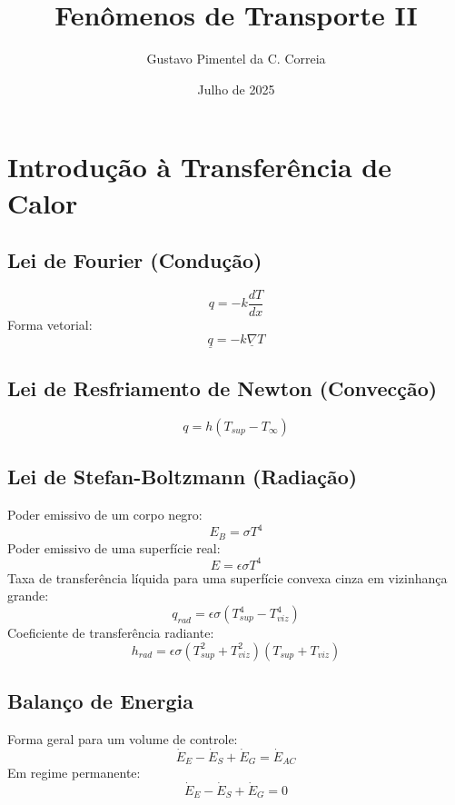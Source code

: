 \documentclass[12pt, a4paper]{article}
\title{\textbf{Fenômenos de Transporte II}}
\author{Gustavo Pimentel da C. Correia}
\date{Julho de 2025}
\begin{document}
\maketitle
\thispagestyle{empty}

\tableofcontents
\newpage

\section{Introdução à Transferência de Calor}

\subsection{Lei de Fourier (Condução)}
\begin{equation}
    q = -k \frac{dT}{dx} 
\end{equation}
Forma vetorial:
\begin{equation}
    \underline{q} = -k \underline{\nabla}T
\end{equation}

\subsection{Lei de Resfriamento de Newton (Convecção)}
\begin{equation}
    q = h (T_{sup} - T_{\infty})
\end{equation}

\subsection{Lei de Stefan-Boltzmann (Radiação)}
Poder emissivo de um corpo negro:
\begin{equation}
    E_B = \sigma T^4
\end{equation}
Poder emissivo de uma superfície real:
\begin{equation}
    E = \epsilon \sigma T^4
\end{equation}
Taxa de transferência líquida para uma superfície convexa cinza em vizinhança grande:
\begin{equation}
    q_{rad} = \epsilon \sigma (T_{sup}^4 - T_{viz}^4)
\end{equation}
Coeficiente de transferência radiante:
\begin{equation}
    h_{rad} = \epsilon \sigma (T_{sup}^2 + T_{viz}^2)(T_{sup} + T_{viz})
\end{equation}

\subsection{Balanço de Energia}
Forma geral para um volume de controle:
\begin{equation}
    \dot{E}_{E} - \dot{E}_{S} + \dot{E}_{G} = \dot{E}_{AC}
\end{equation}
Em regime permanente:
\begin{equation}
    \dot{E}_{E} - \dot{E}_{S} + \dot{E}_{G} = 0
\end{equation}
\end{document}
